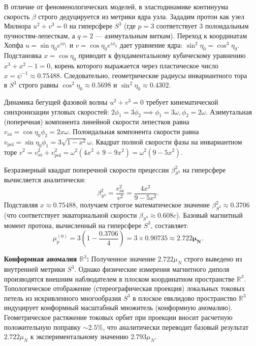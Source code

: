 \documentclass[11pt,a4paper]{article}
\begin{document}
	В отличие от феноменологических моделей, в эластодинамике континуума скорость $\beta$ строго дедуцируется из метрики ядра узла. Зададим протон как узел Милнора $u^2 + v^3 = 0$ на гиперсфере $S^3$ (где $p=3$ соответствует 3 полоидальным пучностям-лепесткам, а $q=2$ — азимутальным виткам). 
	Переход к координатам Хопфа $u = \sin\eta_0 e^{i\phi_1}$ и $v = \cos\eta_0 e^{i\phi_2}$ дает уравнение ядра: $\sin^2\eta_0 = \cos^3\eta_0$. Подстановка $x = \cos\eta_0$ приводит к фундаментальному кубическому уравнению $x^3 + x^2 - 1 = 0$, корень которого выражается через пластическое число $x = \psi^{-1} \approx 0.75488$. Следовательно, геометрические радиусы инвариантного тора в $S^3$ строго равны $\cos^2\eta_0 \approx 0.5698$ и $\sin^2\eta_0 \approx 0.4302$.
	
	Динамика бегущей фазовой волны $u^2 + v^3 = 0$ требует кинематической синхронизации угловых скоростей: $2\dot{\phi}_1 = 3\dot{\phi}_2 \implies \dot{\phi}_1 = 3\omega, \dot{\phi}_2 = 2\omega$.
	Азимутальная (поперечная) компонента линейной скорости лепестков равна $v_{\text{az}} = \cos\eta_0 \dot{\phi}_2 = 2x\omega$.
	Полоидальная компонента скорости равна $v_{\text{pol}} = \sin\eta_0 \dot{\phi}_1 = 3\sqrt{1-x^2}\omega$.
	Квадрат полной скорости фазы на инвариантном торе $v^2 = v_{\text{az}}^2 + v_{\text{pol}}^2 = \omega^2 (4x^2 + 9 - 9x^2) = \omega^2 (9 - 5x^2)$.
	
	Безразмерный квадрат поперечной скорости прецессии $\beta_{S^3}^2$ на гиперсфере вычисляется аналитически:
	\begin{equation}
		\beta_{S^3}^2 = \frac{v_{\text{az}}^2}{v^2} = \frac{4x^2}{9 - 5x^2}.
	\end{equation}
	Подставляя $x \approx 0.75488$, получаем строгое математическое значение $\beta_{S^3}^2 \approx 0.3706$ (что соответствует экваториальной скорости $\beta_{S^3} \approx 0.608 c$).
	Базовый магнитный момент протона, вычисленный на гиперсфере $S^3$, составляет:
	\begin{equation}
		\mu_p^{(0)} = 3 \left(1 - \frac{0.3706}{4}\right) = 3 \times 0.90735 \approx \mathbf{2.722 \mu_N}.
	\end{equation}
	
	\textbf{Конформная аномалия $\mathbb{R}^3$:}
	Полученное значение $2.722 \mu_N$ строго выведено из внутренней метрики $S^3$. Однако физические измерения магнитного диполя производятся внешним наблюдателем в плоском координатном пространстве $\mathbb{R}^3$. Топологическое отображение (стереографическая проекция) локальных токовых петель из искривленного многообразия $S^3$ в плоское евклидово пространство $\mathbb{R}^3$ индуцирует конформный масштабный множитель (конформную аномалию). 
	Геометрическое растяжение токовых орбит при проекции вносит расчетную положительную поправку $\sim 2.5\%$, что аналитически переводит базовый результат $2.722 \mu_N$ к экспериментальному значению $2.793 \mu_N$.
	
\end{document}
